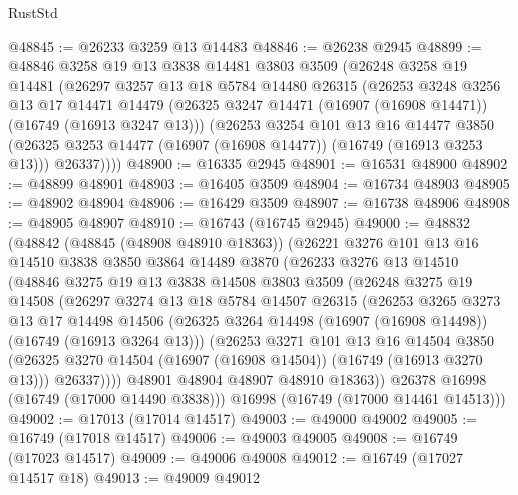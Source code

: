 \begin{lexlean}{RustStd}
\begin{coremodule}
@48845 := @26233 @3259 @13 @14483
@48846 := @26238 @2945
@48899 := @48846
    @3258
    @19
    @13
    @3838
    @14481
    @3803
    @3509
    (@26248
      @3258
      @19
      @14481
      (@26297
        @3257
        @13
        @18
        @5784
        @14480
        @26315
        (@26253
          @3248
          @3256
          @13
          @17
          @14471
          @14479
          (@26325 @3247 @14471 (@16907 (@16908 @14471)) (@16749 (@16913 @3247 @13)))
          (@26253
            @3254
            @101
            @13
            @16
            @14477
            @3850
            (@26325 @3253 @14477 (@16907 (@16908 @14477)) (@16749 (@16913 @3253 @13)))
            @26337))))
@48900 := @16335 @2945
@48901 := @16531 @48900
@48902 := @48899 @48901
@48903 := @16405 @3509
@48904 := @16734 @48903
@48905 := @48902 @48904
@48906 := @16429 @3509
@48907 := @16738 @48906
@48908 := @48905 @48907
@48910 := @16743 (@16745 @2945)
@49000 := @48832
    (@48842
      (@48845 (@48908 @48910 @18363))
      (@26221
        @3276
        @101
        @13
        @16
        @14510
        @3838
        @3850
        @3864
        @14489
        @3870
        (@26233
          @3276
          @13
          @14510
          (@48846
            @3275
            @19
            @13
            @3838
            @14508
            @3803
            @3509
            (@26248
              @3275
              @19
              @14508
              (@26297
                @3274
                @13
                @18
                @5784
                @14507
                @26315
                (@26253
                  @3265
                  @3273
                  @13
                  @17
                  @14498
                  @14506
                  (@26325 @3264 @14498 (@16907 (@16908 @14498)) (@16749 (@16913 @3264 @13)))
                  (@26253
                    @3271
                    @101
                    @13
                    @16
                    @14504
                    @3850
                    (@26325 @3270 @14504 (@16907 (@16908 @14504)) (@16749 (@16913 @3270 @13)))
                    @26337))))
            @48901
            @48904
            @48907
            @48910
            @18363))
        @26378
        @16998
        (@16749 (@17000 @14490 @3838)))
      @16998
      (@16749 (@17000 @14461 @14513)))
@49002 := @17013 (@17014 @14517)
@49003 := @49000 @49002
@49005 := @16749 (@17018 @14517)
@49006 := @49003 @49005
@49008 := @16749 (@17023 @14517)
@49009 := @49006 @49008
@49012 := @16749 (@17027 @14517 @18)
@49013 := @49009 @49012

\end{coremodule}
\end{lexlean}

